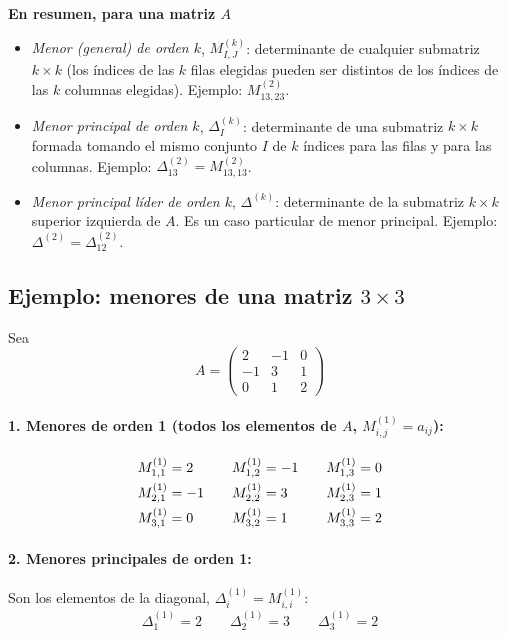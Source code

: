 \documentclass{article}
\begin{document}
\noindent\textbf{En resumen, para una matriz \(A\)}
\begin{itemize}\color{teal}
  \item \emph{Menor (general) de orden \(k\)}, \(M^{(k)}_{I,J}\): determinante de cualquier submatriz \(k\times k\) (los índices de las \(k\) filas elegidas pueden ser distintos de los índices de las \(k\) columnas elegidas). Ejemplo: \(M^{(2)}_{13,23}\).
  \item \emph{Menor principal de orden \(k\)}, \(\Delta^{(k)}_I\): determinante de una submatriz \(k\times k\) formada tomando el mismo conjunto \(I\) de \(k\) índices para las filas y para las columnas. Ejemplo: \(\Delta^{(2)}_{13}=M^{(2)}_{13,13}\).
  \item \emph{Menor principal líder de orden \(k\)}, \(\Delta^{(k)}\): determinante de la submatriz \(k\times k\) superior izquierda de \(A\). Es un caso particular de menor principal. Ejemplo: \(\Delta^{(2)}=\Delta^{(2)}_{12}\).
\end{itemize}

\subsection*{Ejemplo: menores de una matriz \(3\times3\)}

Sea
\[
A=\begin{pmatrix}
2&-1&0\\[4pt]
-1&3&1\\[4pt]
0&1&2
\end{pmatrix}
\]

\paragraph*{1. Menores de orden 1 (todos los elementos de \(A\), \(M^{(1)}_{i,j}=a_{ij}\)):}
\[
\begin{array}{l@{\qquad}l@{\qquad}l}
M^{(1)}_{1,1}=2 & M^{(1)}_{1,2}=-1 & M^{(1)}_{1,3}=0\\[4pt]
M^{(1)}_{2,1}=-1 & M^{(1)}_{2,2}=3 & M^{(1)}_{2,3}=1\\[4pt]
M^{(1)}_{3,1}=0 & M^{(1)}_{3,2}=1 & M^{(1)}_{3,3}=2
\end{array}
\]

\paragraph*{2. Menores principales de orden 1:}
Son los elementos de la diagonal, \(\Delta^{(1)}_i=M^{(1)}_{i,i}\):
\[
\Delta^{(1)}_1=2\qquad\Delta^{(1)}_2=3\qquad\Delta^{(1)}_3=2
\]
\end{document}
